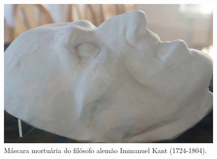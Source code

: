 \movetoevenpage
\begin{absolutelynopagebreak}
\begin{vplace}
\begin{figure}[H]
\begin{adjustwidth}{-1.8cm}{}
  \vspace{2.7cm}
  \includegraphics[width=130mm]{./imgs/kaliningrado2.jpg}  
\end{adjustwidth}
  \caption{Máscara mortuária do filósofo alemão Immanuel Kant (1724-1804).}

\thispagestyle{empty}

\end{figure}
\end{vplace}

\end{absolutelynopagebreak}




